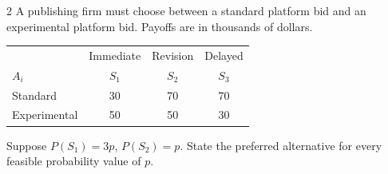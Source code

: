 \begin{multicols}{2}
		A publishing firm must choose between a standard platform bid and an experimental platform bid. Payoffs are in thousands of dollars.\vspace{-3mm}
		\begin{center}\setlength{\tabcolsep}{2pt}\renewcommand{\arraystretch}{1.1}
			\begin{tabular}{lccc}\toprule
				&Immediate&Revision&Delayed\\ 
				$A_i$&$S_1$&$S_2$&$S_3$\\ 
				\midrule
				Standard&30&70&70\\
				Experimental&50&50&30\\ \bottomrule
			\end{tabular}
		\end{center}\vspace{-3mm}
		Suppose $P(S_1)=3p$, $P(S_2)=p$. State the preferred alternative for every feasible probability value of $p$.
		
	\end{multicols}


